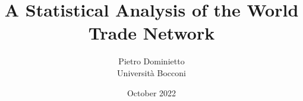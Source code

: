 \documentclass[a4paper,12pt]{report}
\title{A Statistical Analysis of the World Trade Network}
\author{Pietro Dominietto\\Università Bocconi}
\date{October 2022}
\begin{document}
\maketitle


\begin{singlespace}

\tableofcontents

\listoftables
\listoffigures
\end{singlespace}
\pagebreak







\begin{singlespace}
% 
\printbibliography

\appendix

\end{singlespace}
\end{document}
